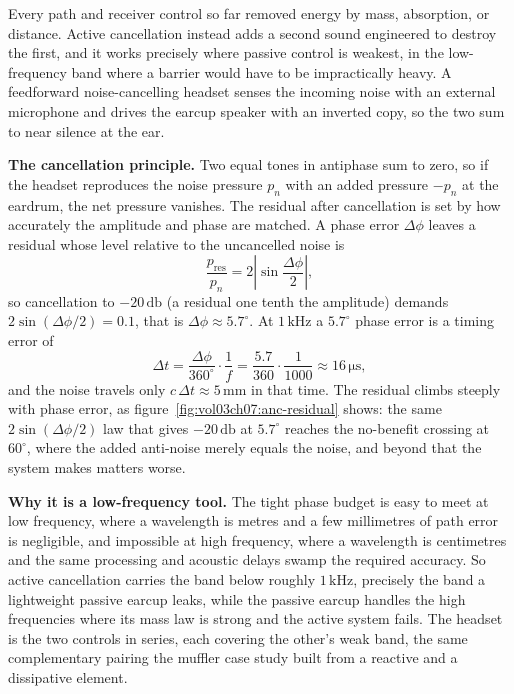 Every path and receiver control so far removed energy by mass, absorption, or
distance. Active cancellation instead adds a second sound engineered to
destroy the first, and it works precisely where passive control is weakest,
in the low-frequency band where a barrier would have to be impractically
heavy. A feedforward noise-cancelling headset senses the incoming noise with
an external microphone and drives the earcup speaker with an inverted copy,
so the two sum to near silence at the ear.

\textbf{The cancellation principle.} Two equal tones in antiphase sum to
zero, so if the headset reproduces the noise pressure $p_n$ with an added
pressure $-p_n$ at the eardrum, the net pressure vanishes. The residual after
cancellation is set by how accurately the amplitude and phase are matched. A
phase error $\Delta\phi$ leaves a residual whose level relative to the
uncancelled noise is
\[
\frac{p_{\text{res}}}{p_n} = 2\left|\sin\frac{\Delta\phi}{2}\right|,
\]
so cancellation to $-20\,\si{\decibel}$ (a residual one tenth the amplitude)
demands $2\sin(\Delta\phi/2)=0.1$, that is $\Delta\phi\approx 5.7^{\circ}$.
At $1\,\si{\kilo\hertz}$ a $5.7^{\circ}$ phase error is a timing error of
\[
\Delta t = \frac{\Delta\phi}{360^{\circ}}\cdot\frac{1}{f}
        = \frac{5.7}{360}\cdot\frac{1}{1000}
        \approx 16\,\si{\micro\second},
\]
and the noise travels only $c\,\Delta t\approx 5\,\si{\milli\meter}$ in that
time. The residual climbs steeply with phase error, as
figure~\ref{fig:vol03ch07:anc-residual} shows: the same $2\sin(\Delta\phi/2)$
law that gives $-20\,\si{\decibel}$ at $5.7^{\circ}$ reaches the
no-benefit crossing at $60^{\circ}$, where the added anti-noise merely
equals the noise, and beyond that the system makes matters worse.



\textbf{Why it is a low-frequency tool.} The tight phase budget is easy to
meet at low frequency, where a wavelength is metres and a few millimetres of
path error is negligible, and impossible at high frequency, where a
wavelength is centimetres and the same processing and acoustic delays swamp
the required accuracy. So active cancellation carries the band below roughly
$1\,\si{\kilo\hertz}$, precisely the band a lightweight passive earcup leaks,
while the passive earcup handles the high frequencies where its mass law is
strong and the active system fails. The headset is the two controls in
series, each covering the other's weak band, the same complementary pairing
the muffler case study built from a reactive and a dissipative element.

